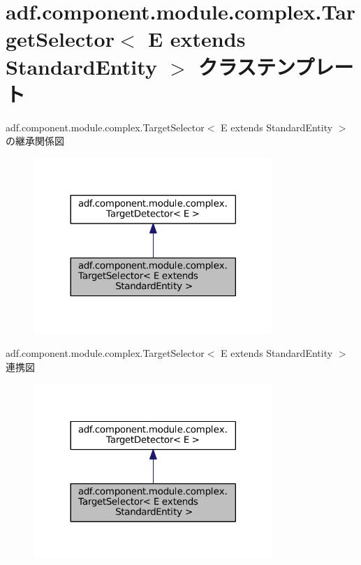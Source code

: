 \hypertarget{classadf_1_1component_1_1module_1_1complex_1_1TargetSelector}{}\section{adf.\+component.\+module.\+complex.\+Target\+Selector$<$ E extends Standard\+Entity $>$ クラステンプレート}
\label{classadf_1_1component_1_1module_1_1complex_1_1TargetSelector}


adf.\+component.\+module.\+complex.\+Target\+Selector$<$ E extends Standard\+Entity $>$ の継承関係図
\nopagebreak
\begin{figure}[H]
\begin{center}
\leavevmode
\includegraphics[width=257pt]{classadf_1_1component_1_1module_1_1complex_1_1TargetSelector__inherit__graph}
\end{center}
\end{figure}


adf.\+component.\+module.\+complex.\+Target\+Selector$<$ E extends Standard\+Entity $>$ 連携図
\nopagebreak
\begin{figure}[H]
\begin{center}
\leavevmode
\includegraphics[width=257pt]{classadf_1_1component_1_1module_1_1complex_1_1TargetSelector__coll__graph}
\end{center}
\end{figure}

